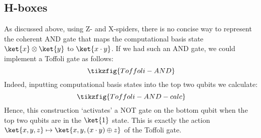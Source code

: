 \documentclass[a4paper,onecolumn,superscriptaddress,11pt,%
				unpublished,%
				allowfontchageintitle,%
				]{quantumarticle}
\begin{document}
\subsection{H-boxes}\label{sec:H-boxes}

As discussed above, using Z- and X-spiders, there is no concise way to represent the coherent AND gate that maps the computational basis state $\ket{x}\otimes \ket{y}$ to $\ket{x\cdot y}$.
If we had such an AND gate, we could implement a Toffoli gate as follows:
\begin{equation}
\tikzfig{Toffoli-AND}
\end{equation}
Indeed, inputting computational basis states into the top two qubits we calculate:
\begin{equation}
\tikzfig{Toffoli-AND-calc}
\end{equation}
Hence, this construction `activates' a NOT gate on the bottom qubit when the top two qubits are in the $\ket{1}$ state. This is exactly the action $\ket{x,y,z} \mapsto \ket{x,y, (x\cdot y)\oplus z}$ of the Toffoli gate.
\end{document}

